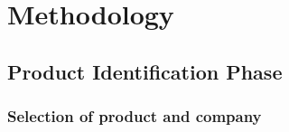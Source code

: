 \newpage
\section{Methodology}
\subsection{Product Identification Phase}
\subsubsection{Selection of product and company}




 



